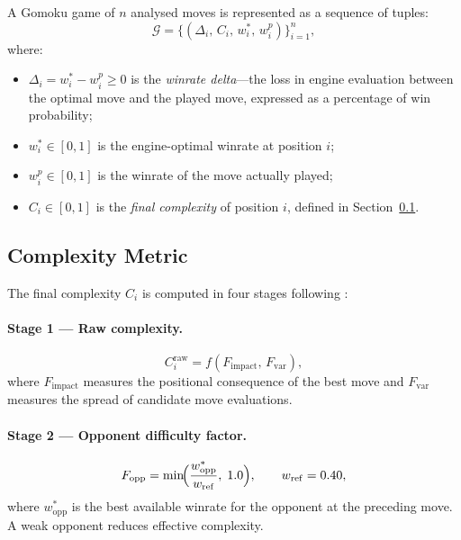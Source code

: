 \documentclass[11pt,a4paper]{article}
\begin{document}
A Gomoku game of $n$ analysed moves is represented as a sequence of tuples:
\begin{equation}
  \mathcal{G} = \bigl\{(\Delta_i,\, C_i,\, w^*_i,\, w^p_i)\bigr\}_{i=1}^{n},
\end{equation}
where:
\begin{itemize}
  \item $\Delta_i = w^*_i - w^p_i \geq 0$ is the \emph{winrate delta}---the
    loss in engine evaluation between the optimal move and the played move,
    expressed as a percentage of win probability;
  \item $w^*_i \in [0,1]$ is the engine-optimal winrate at position $i$;
  \item $w^p_i \in [0,1]$ is the winrate of the move actually played;
  \item $C_i \in [0,1]$ is the \emph{final complexity} of position $i$,
    defined in Section~\ref{sec:complexity}.
\end{itemize}

\subsection{Complexity Metric}
\label{sec:complexity}

The final complexity $C_i$ is computed in four stages following
\citet{nguyen2025bayesian}:

\paragraph{Stage 1 --- Raw complexity.}
\begin{equation}
  C_i^{\mathrm{raw}} = f(F_{\mathrm{impact}},\, F_{\mathrm{var}}),
\end{equation}
where $F_{\mathrm{impact}}$ measures the positional consequence of the
best move and $F_{\mathrm{var}}$ measures the spread of candidate
move evaluations.

\paragraph{Stage 2 --- Opponent difficulty factor.}
\begin{equation}
  F_{\mathrm{opp}} = \min\!\Bigl(\frac{w^*_{\mathrm{opp}}}{w_{\mathrm{ref}}},\; 1.0\Bigr),
  \qquad w_{\mathrm{ref}} = 0.40,
\end{equation}
where $w^*_{\mathrm{opp}}$ is the best available winrate for the opponent
at the preceding move. A weak opponent reduces effective complexity.
\end{document}
